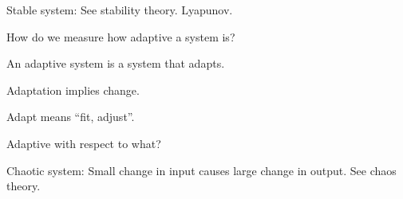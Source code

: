 Stable system:
See stability theory.
Lyapunov.

How do we measure how adaptive a system is?

An adaptive system is a system that adapts.

Adaptation implies change.

Adapt means ``fit, adjust''.


Adaptive with respect to what?

Chaotic system:
Small change in input causes large change in output.
See chaos theory.
